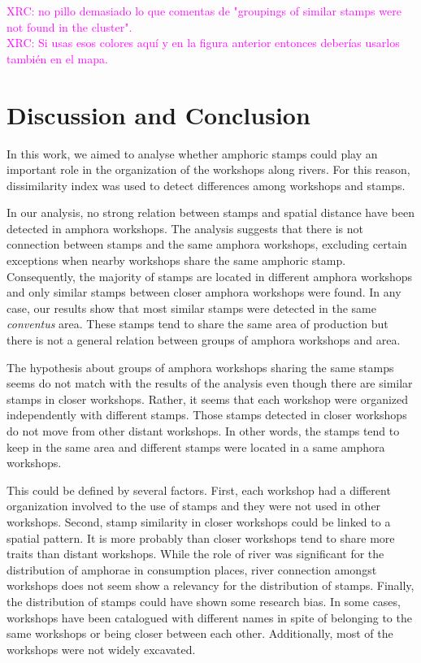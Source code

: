 \documentclass[review]{elsarticle}
\newcommand{\memo}[2]{\textcolor{#1}{#2}}
\newcommand{\xavi}[1]{\memo{magenta}{XRC: #1\\}}
\begin{document}
\xavi{no pillo demasiado lo que comentas de "groupings of similar stamps were not found in the cluster".}
\xavi{Si usas esos colores aquí y en la figura anterior entonces deberías usarlos también en el mapa.}




\section{Discussion and Conclusion}


In this work, we aimed to analyse whether amphoric stamps could play an important role in the organization of the workshops along rivers. For this reason, dissimilarity index was used to detect differences among workshops and stamps. 

In our analysis, no strong relation between stamps and spatial distance have been detected in amphora workshops. The analysis suggests that there is not connection between stamps and the same amphora workshops, excluding certain exceptions when nearby workshops share the same amphoric stamp. Consequently, the majority of stamps are located in different amphora workshops and only similar stamps between closer amphora workshops were found. In any case, our results show that most similar stamps were detected in the same \textit{conventus} area. These stamps tend to share the same area of production but there is not a general relation between groups of amphora workshops and area. 

The hypothesis about groups of amphora workshops sharing the same stamps seems do not match with the results of the analysis even though there are similar stamps in closer workshops. Rather, it seems that each workshop were organized independently with different stamps. Those stamps detected in closer workshops do not move from other distant workshops. In other words, the stamps tend to keep in the same area and different stamps were located in a same amphora workshops. 

This could be defined by several factors. First, each workshop had a different organization involved to the use of stamps and they were not used in other workshops. Second, stamp similarity in closer workshops could be linked to a spatial pattern. It is more probably than closer workshops tend to share more traits than distant workshops. While the role of river was significant for the distribution of amphorae in consumption places, river connection amongst workshops does not seem show a relevancy for the distribution of stamps. Finally, the distribution of stamps could have shown some research bias. In some cases, workshops have been catalogued with different names in spite of belonging to the same workshops or being closer between each other. Additionally, most of the workshops were not widely excavated. 
\end{document}
